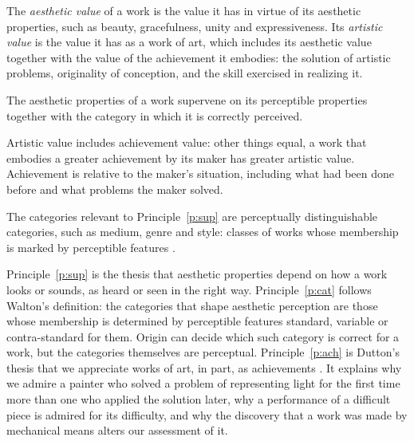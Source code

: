 \documentclass{situationist-preprint}
\begin{document}
\begin{definition}\label{d:values}
The \emph{aesthetic value} of a work is the value it has in virtue of its aesthetic properties, such as beauty, gracefulness, unity and expressiveness. Its \emph{artistic value} is the value it has as a work of art, which includes its aesthetic value together with the value of the achievement it embodies: the solution of artistic problems, originality of conception, and the skill exercised in realizing it.
\end{definition}

\begin{principle}\label{p:sup}
The aesthetic properties of a work supervene on its perceptible properties together with the category in which it is correctly perceived.
\end{principle}

\begin{principle}[Achievement]\label{p:ach}
Artistic value includes achievement value: other things equal, a work that embodies a greater achievement by its maker has greater artistic value. Achievement is relative to the maker's situation, including what had been done before and what problems the maker solved.
\end{principle}

\begin{principle}[Categories]\label{p:cat}
The categories relevant to Principle~\ref{p:sup} are perceptually distinguishable categories, such as medium, genre and style: classes of works whose membership is marked by perceptible features \citep{Walton1970}.
\end{principle}

Principle~\ref{p:sup} is the thesis that aesthetic properties depend on how a work looks or sounds, as heard or seen in the right way. Principle~\ref{p:cat} follows Walton's definition: the categories that shape aesthetic perception are those whose membership is determined by perceptible features standard, variable or contra-standard for them. Origin can decide which such category is correct for a work, but the categories themselves are perceptual. Principle~\ref{p:ach} is Dutton's thesis that we appreciate works of art, in part, as achievements \citep{Dutton1979}. It explains why we admire a painter who solved a problem of representing light for the first time more than one who applied the solution later, why a performance of a difficult piece is admired for its difficulty, and why the discovery that a work was made by mechanical means alters our assessment of it.
\end{document}
